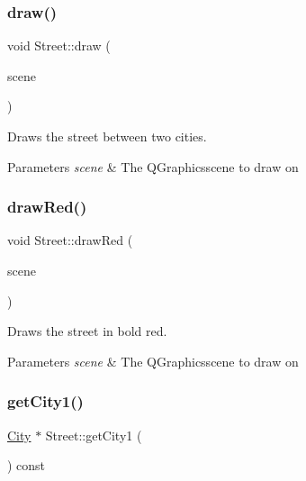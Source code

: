 \subsubsection{\texorpdfstring{draw()}{draw()}}
{\footnotesize\ttfamily void Street\+::draw (\begin{DoxyParamCaption}\item[{Q\+Graphics\+Scene \&}]{scene }\end{DoxyParamCaption})}



Draws the street between two cities. 


\begin{DoxyParams}{Parameters}
{\em scene} & The Q\+Graphicsscene to draw on \\
\hline
\end{DoxyParams}
\mbox{\label{class_street_a64316b1ab76eb572376f47fdb3f8fcc8}} 
\subsubsection{\texorpdfstring{draw\+Red()}{drawRed()}}
{\footnotesize\ttfamily void Street\+::draw\+Red (\begin{DoxyParamCaption}\item[{Q\+Graphics\+Scene \&}]{scene }\end{DoxyParamCaption})}



Draws the street in bold red. 


\begin{DoxyParams}{Parameters}
{\em scene} & The Q\+Graphicsscene to draw on \\
\hline
\end{DoxyParams}
\mbox{\label{class_street_ab8d3699fb6ea3a4da8b1ca9b6b440db8}} 
\subsubsection{\texorpdfstring{get\+City1()}{getCity1()}}
{\footnotesize\ttfamily \hyperlink{class_city}{City} $\ast$ Street\+::get\+City1 (\begin{DoxyParamCaption}{ }\end{DoxyParamCaption}) const}



